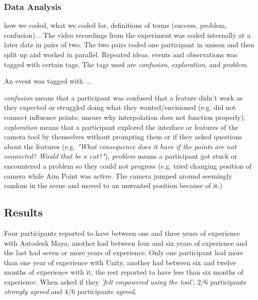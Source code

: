 \subsubsection{Data Analysis}
how we coded, what we coded for, definitions of terms (success, problem, confusion)...
The video recordings from the experiment was coded internally at a later date in pairs of two. The two pairs coded one participant in unison and then split up and worked in parallel. Repeated ideas, events and observations was tagged with certain tags. The tags used are \textit{confusion}, \textit{exploration}, and \textit{problem}.

An event was tagged with ...


\textit{confusion} means that a participant was confused that a feature didn't work as they expected or struggled doing what they wanted/envisioned (e.g. did not connect influence points; unsure why interpolation does not function properly), 
\textit{exploration} means that a participant explored the interface or features of the camera tool by themselves without prompting them or if they asked questions about the features (e.g. \textit{"What consequence does it have if the points are not connected? Would that be a cut?"}), 
\textit{problem} means a participant got stuck or encountered a problem so they could not progress (e.g. tried changing position of camera while Aim Point was active. The camera jumped around seemingly random in the scene and moved to an unwanted position because of it.)

\subsection{Results} \label{results}
Four participants reported to have between one and three years of experience with Autodesk Maya, another had between four and six years of experience and the last had seven or more years of experience. Only one participant had more than one year of experience with Unity, another had between six and twelve months of experience with it, the rest reported to have less than six months of experience.
When asked if they \textit{'felt empowered using the tool'}, 2/6 participants \textit{strongly agreed} and 4/6 participants \textit{agreed}.

